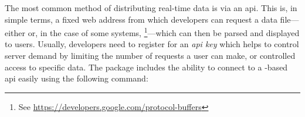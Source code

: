 The most common method of distributing real-time data is via an \gls{api}. This is, in simple terms, a fixed web address from which developers can request a data file---either  or, in the case of some \GTFS{} systems, \footnote{See \url{https://developers.google.com/protocol-buffers}}---which can then be parsed and displayed to users. Usually, developers need to register for an \emph{\gls{api} key} which helps to control server demand by limiting the number of requests a user can make, or controlled access to specific data. The  package includes the ability to connect to a \GTFS{}-based \gls{api} easily using the following command:
\begin{knitrout}\small
{}\color{fgcolor}
\end{knitrout}
